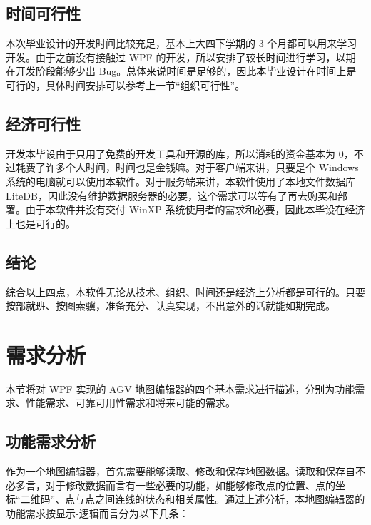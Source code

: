 \subsection{时间可行性}

本次毕业设计的开发时间比较充足，基本上大四下学期的 3 个月都可以用来学习开发。由于之前没有接触过 WPF 的开发，所以安排了较长时间进行学习，以期在开发阶段能够少出 Bug。总体来说时间是足够的，因此本毕业设计在时间上是可行的，具体时间安排可以参考上一节``组织可行性''。

\subsection{经济可行性}

开发本毕设由于只用了免费的开发工具和开源的库，所以消耗的资金基本为 0，不过耗费了许多个人时间，时间也是金钱嘛。对于客户端来讲，只要是个 Windows 系统的电脑就可以使用本软件。对于服务端来讲，本软件使用了本地文件数据库 LiteDB，因此没有维护数据服务器的必要，这个需求可以等有了再去购买和部署。由于本软件并没有交付 WinXP 系统使用者的需求和必要，因此本毕设在经济上也是可行的。

\subsection{结论}

综合以上四点，本软件无论从技术、组织、时间还是经济上分析都是可行的。只要按部就班、按图索骥，准备充分、认真实现，不出意外的话就能如期完成。

\section{需求分析}

本节将对 WPF 实现的 AGV 地图编辑器的四个基本需求进行描述，分别为功能需求、性能需求、可靠可用性需求和将来可能的需求。

\subsection{功能需求分析}

作为一个地图编辑器，首先需要能够读取、修改和保存地图数据。读取和保存自不必多言，对于修改数据而言有一些必要的功能，如能够修改点的位置、点的坐标``二维码''、点与点之间连线的状态和相关属性。通过上述分析，本地图编辑器的功能需求按显示-逻辑而言分为以下几条：

